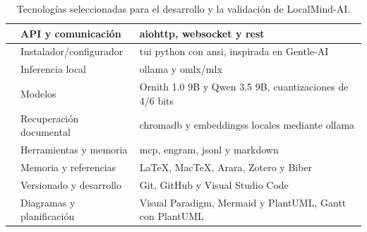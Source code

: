 \begin{table}
\begin{tabularx}{\textwidth}{|>{\raggedright\arraybackslash}p{3.1cm}|>{\raggedright\arraybackslash}p{5.1cm}|>{\raggedright\arraybackslash}X|}
        \cline{2-3}
                                         & API y comunicación        & \gls{aiohttp}, \gls{websocket} y \gls{rest}                                                                     \\
        \cline{2-3}
                                         & Instalador/configurador   & \Gls{tui} \gls{python} con \gls{ansi}, inspirada en Gentle-AI                                                   \\
        \cline{2-3}
                                         & Inferencia local          & \Gls{ollama} y \gls{omlx}/\gls{mlx}                                                                             \\
        \cline{2-3}
                                         & Modelos                   & Ornith 1.0 9B y Qwen 3.5 9B, cuantizaciones de 4/6 bits                                                         \\
        \cline{2-3}
                                         & Recuperación documental   & \Gls{chromadb} y \glspl{embeddings} locales mediante \gls{ollama}                                               \\
        \cline{2-3}
                                         & Herramientas y memoria    & \Gls{mcp}, \gls{engram}, \gls{jsonl} y \gls{markdown}                                                           \\
        \cline{2-3}
                                         & Memoria y referencias     & LaTeX, MacTeX, Arara, Zotero y Biber                                                                            \\
        \cline{2-3}
                                         & Versionado y desarrollo   & Git, GitHub y Visual Studio Code                                                                                \\
        \cline{2-3}
                                         & Diagramas y planificación & Visual Paradigm, Mermaid y PlantUML, Gantt con PlantUML                                                         \\
        \hline
    \end{tabularx}
    \caption{Tecnologías seleccionadas para el desarrollo y la validación de LocalMind-AI.}
    \label{tab:tecnologias-localmind}
\end{table}

